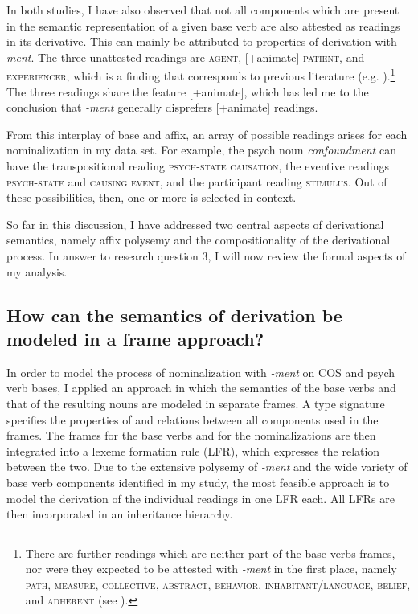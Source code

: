 In both studies, I have also observed that not all components which are present in the semantic representation of a given base verb are also attested as readings in its derivative. This can mainly be attributed to properties of derivation with \textit{-ment}. The three unattested readings are \textsc{agent}, [+animate] \textsc{patient,} and \textsc{experiencer}, which is a finding that corresponds to previous literature (e.g. \citealt{Lieber.2016}).\footnote{There are further readings which are neither part of the base verbs frames, nor were they expected to be attested with \textit{-ment} in the first place, namely \textsc{path, measure, collective, abstract, behavior, inhabitant/language, belief,} and \textsc{adherent} (see \citealt{Lieber.2016}).} The three readings share the feature [+animate], which has led me to the conclusion that \textit{-ment} generally disprefers [+animate] readings. 

From this interplay of base and affix, an array of possible readings arises for each nominalization in my data set. For example, the psych noun \textit{confoundment} can have the transpositional reading \textsc{psych-state causation}, the eventive readings \textsc{psych-state} and \textsc{causing event}, and the participant reading \textsc{stimulus}.
Out of these possibilities, then, one or more is selected in context.

So far in this discussion, I have addressed two central aspects of derivational semantics, namely affix polysemy and the compositionality of the derivational process. In answer to research question 3, I will now review the formal aspects of my analysis.

\subsection{How can the semantics of derivation be modeled in a frame approach?}

In order to model the process of nominalization with \textit{-ment} on COS and psych verb bases, I applied an approach in which the semantics of the base verbs and that of the resulting nouns are modeled in separate frames. A type signature specifies the properties of and relations between all components used in the frames.  
The frames for the base verbs and for the nominalizations are then integrated into a lexeme formation rule (LFR), which expresses the relation between the two. Due to the extensive polysemy of \textit{-ment} and the wide variety of base verb components identified in my study, the most feasible approach is to model the derivation of the individual readings in one LFR each. All LFRs are then incorporated in an inheritance hierarchy.  


